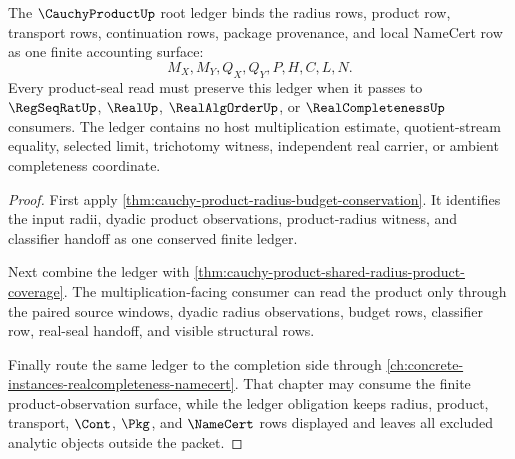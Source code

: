 \begin{theorem}
\label{thm:cauchy-product-ledger-obligation}
The $\CauchyProductUp$ root ledger binds the radius rows, product row, transport rows, continuation rows, package provenance, and local NameCert row as one finite accounting surface:
$$
M_X,M_Y,Q_X,Q_Y,P,H,C,L,N.
$$
Every product-seal read must preserve this ledger when it passes to $\RegSeqRatUp$, $\RealUp$, $\RealAlgOrderUp$, or $\RealCompletenessUp$ consumers. The ledger contains no host multiplication estimate, quotient-stream equality, selected limit, trichotomy witness, independent real carrier, or ambient completeness coordinate.
\end{theorem}
\begin{proof}
First apply \autoref{thm:cauchy-product-radius-budget-conservation}. It identifies the input radii, dyadic product observations, product-radius witness, and classifier handoff as one conserved finite ledger.

Next combine the ledger with \autoref{thm:cauchy-product-shared-radius-product-coverage}. The multiplication-facing consumer can read the product only through the paired source windows, dyadic radius observations, budget rows, classifier row, real-seal handoff, and visible structural rows.

Finally route the same ledger to the completion side through \autoref{ch:concrete-instances-realcompleteness-namecert}. That chapter may consume the finite product-observation surface, while the ledger obligation keeps radius, product, transport, $\Cont$, $\Pkg$, and $\NameCert$ rows displayed and leaves all excluded analytic objects outside the packet.
\end{proof}

